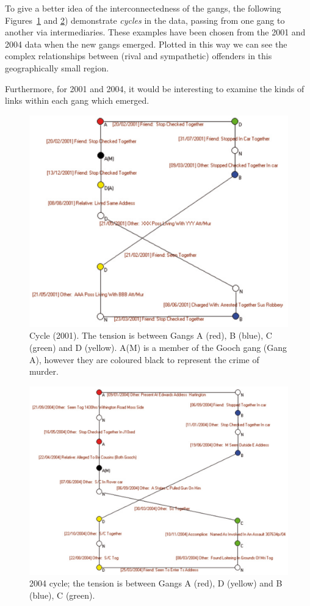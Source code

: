 \documentclass[conference]{IEEEtran}
\theoremstyle{definition}
\begin{document}
To give a better idea of the interconnectedness of the gangs, the
following Figures~\ref{fig:chain2001} and \ref{fig:chain2004}) demonstrate
\emph{cycles} in the data, passing from one gang to another via
intermediaries.  These examples have been chosen from the 2001 and
2004 data when the new gangs emerged. Plotted in this way we can see
the complex relationships between (rival and sympathetic) offenders in
this geographically small region.

Furthermore, for 2001 and 2004, it would be interesting to examine the
kinds of links within each gang which emerged.

\begin{figure}[!ht] 
\centering
\includegraphics[width=\columnwidth]{images/chain2001}
\caption{Cycle (2001). The tension is between Gangs A (red), B (blue),
 C (green) and D (yellow). A(M) is a member of the Gooch gang (Gang A), however they are coloured black to represent the crime of murder.}
\label{fig:chain2001}
\end{figure}


\begin{figure}[!ht] 
\centering
\includegraphics[width=\columnwidth]{images/chain2004}
\caption{2004 cycle; the tension is between Gangs A (red), D (yellow) and B (blue), C (green).}
\label{fig:chain2004}
\end{figure}
\end{document}

